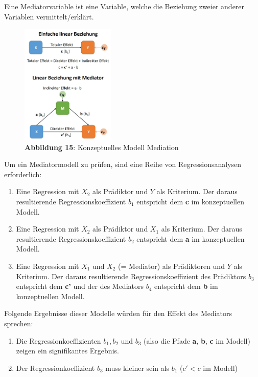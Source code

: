 \documentclass[]{article}
\providecommand{\tightlist}{%
  \setlength{\itemsep}{0pt}\setlength{\parskip}{0pt}}
\begin{document}
Eine Mediatorvariable ist eine Variable, welche die Beziehung zweier anderer Variablen vermittelt/erklärt.

\begin{figure}
\centering
\includegraphics[width=0.4\textwidth,height=\textheight]{Images/MediatorModell.JPG}
\caption{\textbf{Abbildung 15}: Konzeptuelles Modell Mediation}
\end{figure}

Um ein Mediatormodell zu prüfen, sind eine Reihe von Regressionsanalysen erforderlich:

\begin{enumerate}
\def\labelenumi{\arabic{enumi}.}
\item
  Eine Regression mit \(X_2\) als Prädiktor und \(Y\) als Kriterium. Der daraus resultierende Regressionskoeffizient \(b_1\) entspricht dem \textbf{c} im konzeptuellen Modell.
\item
  Eine Regression mit \(X_2\) als Prädiktor und \(X_1\) als Kriterium. Der daraus resultierende Regressionskoeffizient \(b_2\) entspricht dem \textbf{a} im konzeptuellen Modell.
\item
  Eine Regression mit \(X_1\) und \(X_2\) (= Mediator) als Prädiktoren und \(Y\) als Kriterium. Der daraus resultierende Regressionskoeffizient des Prädiktors \(b_3\) entspricht dem \textbf{c'} und der des Mediators \(b_4\) entspricht dem \textbf{b} im konzeptuellen Modell.
\end{enumerate}

Folgende Ergebnisse dieser Modelle würden für den Effekt des Mediators sprechen:

\begin{enumerate}
\def\labelenumi{\arabic{enumi}.}
\tightlist
\item
  Die Regressionkoeffizienten \(b_1, b_2\) und \(b_3\) (also die Pfade \textbf{a}, \textbf{b}, \textbf{c} im Modell) zeigen ein signifikantes Ergebnis.
\item
  Der Regressionkoeffizient \(b_3\) muss kleiner sein als \(b_1\) (\(c' < c\) im Modell)
\end{enumerate}
\end{document}
